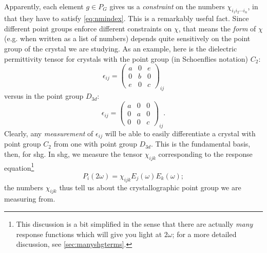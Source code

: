 Apparently, each element $g \in P_G$ gives us a \emph{constraint} on the numbers $\chi_{i_1i_2\cdots i_n}$, in that they have to satisfy \cref{eq:nmindex}. 
This is a remarkably useful fact.
Since different point groups enforce different constraints on $\chi$, that means the \emph{form} of $\chi$ (e.g. when written as a list of numbers) depends quite sensitively on the point group of the crystal we are studying.
As an example, here is the dielectric permittivity tensor for crystals with the point group (in Schoenflies notation) $C_2$:
\begin{equation}\label{eq:c2eps}
\epsilon_{ij} = \left(\begin{matrix}
a & 0 & e \\
0 & b & 0 \\
e & 0 & c
\end{matrix}\right)_{ij}
\end{equation}
versus in the point group $D_{3d}$:
\begin{equation}\label{eq:d3deps}
\epsilon_{ij} = \left(\begin{matrix}
a & 0 & 0 \\
0 & a & 0 \\
0 & 0 & c
\end{matrix}\right)_{ij}.
\end{equation}
Clearly, any \emph{measurement} of $\epsilon_{ij}$ will be able to easily differentiate a crystal with point group $C_2$ from one with point group $D_{3d}$.
This is the fundamental basis, then, for \gls{shg}.
In \gls{shg}, we measure the tensor $\chi_{ijk}$ corresponding to the response equation\footnote{This discussion is a bit simplified in the sense that there are actually \emph{many} response functions which will give you light at $2\omega$; for a more detailed discussion, see \cref{sec:manyshgterms}.}
\begin{equation}\label{eq:shgsimple}
P_i(2\omega) = \chi_{ijk}E_j(\omega)E_k(\omega);
\end{equation}
the numbers $\chi_{ijk}$ thus tell us about the crystallographic point group we are measuring from.

